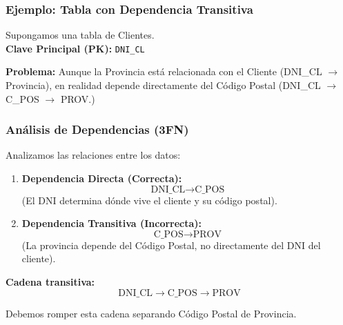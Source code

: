 \documentclass{beamer}
\begin{document}
\begin{frame}
  \frametitle{Ejemplo: Tabla con Dependencia Transitiva}

  Supongamos una tabla de Clientes.
  \\ \textbf{Clave Principal (PK):} \texttt{DNI\_CL}

  \begin{center}
  \end{center}
  
  \vspace{0.5em}
  \small{\textbf{Problema:} Aunque la Provincia está relacionada con el Cliente (DNI\_CL $\to$ Provincia), en realidad depende directamente del Código Postal (DNI\_CL $\to$ C\_POS $\to$ PROV.)}
\end{frame}

\begin{frame}
  \frametitle{Análisis de Dependencias (3FN)}

  Analizamos las relaciones entre los datos:

  \begin{enumerate}
      \item \textbf{Dependencia Directa (Correcta):}
      $$ \text{DNI\_CL} \to \text{C\_POS} $$
      (El DNI determina dónde vive el cliente y su código postal).

      \item \textbf{Dependencia Transitiva (Incorrecta):}
      $$ \text{C\_POS} \to \text{PROV} $$
      (La provincia depende del Código Postal, no directamente del DNI del cliente).
  \end{enumerate}

  \vspace{1em}
  \textbf{Cadena transitiva:}
  $$ \text{DNI\_CL} \to \text{C\_POS} \to \text{PROV} $$
  
  Debemos romper esta cadena separando Código Postal de Provincia.
\end{frame}
\end{document}
